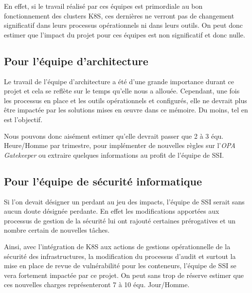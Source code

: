 En effet, si le travail réalisé par ces équipes est primordiale au bon fonctionnement des clusters \ac{K8S}, ces dernières
ne verront pas de changement significatif dans leurs processus opérationnels ni dans leurs outils.
\newline On peut donc estimer que l'impact du projet pour ces équipes est non significatif et donc nulle.

\subsection{Pour l'équipe d'architecture}
Le travail de l'équipe d'architecture a été d'une grande importance durant ce projet et cela se reflète sur le temps 
qu'elle nous a allouée. Cependant, une fois les processus en place et les outils opérationnels et configurés, elle ne 
devrait plus être impactée par les solutions mises en œuvre dans ce mémoire. Du moins, tel en est l'objectif.

Nous pouvons donc aisément estimer qu'elle devrait passer que 2 à 3 équ. Heure/Homme par trimestre, pour implémenter
de nouvelles règles sur l'\emph{OPA Gatekeeper} ou extraire quelques informations au profit de l'équipe de \ac{SSI}.

\subsection{Pour l'équipe de sécurité informatique}
Si l'on devait désigner un perdant au jeu des impacts, l'équipe de \ac{SSI} serait sans aucun doute désignée perdante.
\newline En effet les modifications apportées aux processus de gestion de la sécurité lui ont rajouté certaines prérogatives
et un nombre certain de nouvelles tâches.

Ainsi, avec l'intégration de \ac{K8S} aux actions de gestions opérationnelle de la sécurité des infrastructures, 
la modification du processus d'audit et surtout la mise en place de revue de vulnérabilité pour les conteneurs,
l'équipe de \ac{SSI} se vera fortement impactée par ce projet.
\newline On peut sans trop de réserve estimer que ces nouvelles charges représenteront 7 à 10 équ. Jour/Homme.